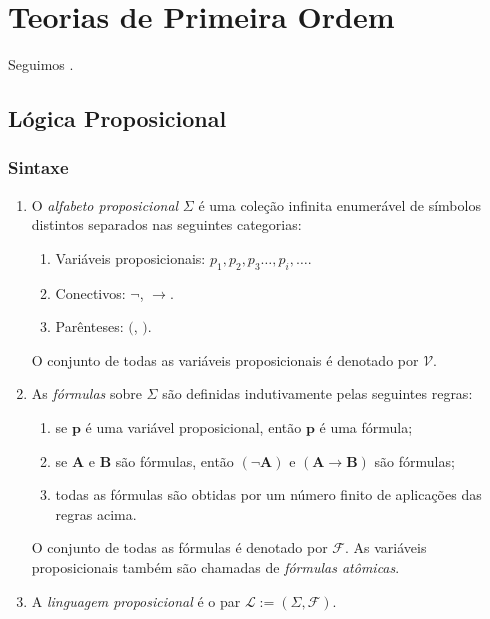 
\chapter{Teorias de Primeira Ordem}

Seguimos \cite{herculespaulovich}.

\section{Lógica Proposicional}

\subsection{Sintaxe}

\begin{definition}
    \leavevmode
    \begin{enumerate}[leftmargin=*, align=left, label=\textbf{(\alph*)}]
            \item O \emph{alfabeto proposicional} $\Sigma$ é uma coleção infinita enumerável de símbolos distintos separados nas seguintes categorias:
                \begin{enumerate}[label=\roman*.]
                    \item Variáveis proposicionais: $p_1, p_2, p_3 \ldots, p_i, \ldots$.
                    \item Conectivos: $\neg$, $\rightarrow$.
                    \item Parênteses: $($, $)$.
            \end{enumerate}
            O conjunto de todas as variáveis proposicionais é denotado por $\mathcal{V}$.
            \item As \emph{fórmulas} sobre $\Sigma$ são definidas indutivamente pelas seguintes regras:
                \begin{enumerate}[label=\roman*.]
                    \item se $\mathbf{p}$ é uma variável proposicional, então $\mathbf{p}$ é uma fórmula;
                    \item se $\mathbf{A}$ e $\mathbf{B}$ são fórmulas, então $(\neg \mathbf{A})$ e $(\mathbf{A} \rightarrow \mathbf{B})$ são fórmulas;
                    \item todas as fórmulas são obtidas por um número finito de aplicações das regras acima. 
            \end{enumerate}
            O conjunto de todas as fórmulas é denotado por $\mathcal{F}$. As variáveis proposicionais também são chamadas de \emph{fórmulas atômicas}.
        \item A \emph{linguagem proposicional} é o par $\mathcal{L} := (\Sigma, \mathcal{F})$.
    \end{enumerate}
\end{definition}

